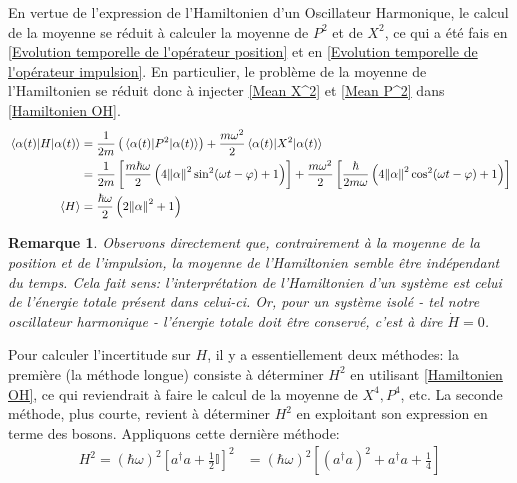 \documentclass[11pt,oneside,a4paper]{article}
\newcommand{\h}{\ensuremath{\hbar}}
\newtheorem{remark}[theorem]{Remarque}
\begin{document}
En vertue de l'expression de l'Hamiltonien d'un Oscillateur Harmonique, le calcul de la moyenne se réduit à calculer la moyenne de $P^2$ et de $X^2$, ce qui a été fais en \ref{Evolution temporelle de l'opérateur position} et en \ref{Evolution temporelle de l'opérateur impulsion}. En particulier, le problème de la moyenne de l'Hamiltonien se réduit donc à injecter \eqref{Mean X^2} et \eqref{Mean P^2} dans \eqref{Hamiltonien OH}.
\begin{align}
  \expval{H}{\alpha(t)} &= \frac{1}{2m}\left(\expval{P^2}{\alpha(t)}\right) + \frac{m\omega^2}{2}\expval{X^2}{\alpha(t)}\\
  &= \frac{1}{2m} \left[\frac{m\h\omega}{2}\left(4\norm{\alpha}^2\sin^2(\omega t-\varphi)+1\right)\right] + \frac{m\omega^2}{2}\left[\frac{\h}{2m\omega}\left(4\norm{\alpha}^2\cos^2(\omega t-\varphi)+1\right)\right]\\
  \expval{H} &= \frac{\h\omega}{2}\left(2\norm{\alpha}^2+1\right)\label{mean H}
\end{align}
\begin{remark}
  Observons directement que, contrairement à la moyenne de la position et de l'impulsion, la moyenne de l'Hamiltonien semble être indépendant du temps. Cela fait sens: l'interprétation de l'Hamiltonien d'un système est celui de l'énergie totale présent dans celui-ci. Or, pour un système isolé - tel notre oscillateur harmonique - l'énergie totale doit être conservé, c'est à dire $\dot{H} = 0$.
\end{remark}

Pour calculer l'incertitude sur $H$, il y a essentiellement deux méthodes: la première (la méthode longue) consiste à déterminer $H^2$ en utilisant \eqref{Hamiltonien OH}, ce qui reviendrait à faire le calcul de la moyenne de $X^4,P^4$, etc. La seconde méthode, plus courte, revient à déterminer $H^2$ en exploitant son expression en terme des bosons. Appliquons cette dernière méthode:
\begin{align}
  H^2 = \left(\h\omega\right)^2\left[a^\dagger a+\frac{1}{2}\mathbb{I}\right]^2 &= \left(\h\omega\right)^2\left[\left(a^\dagger a\right)^2+a^\dagger a+\frac{1}{4}\right]
\end{align}
\end{document}
